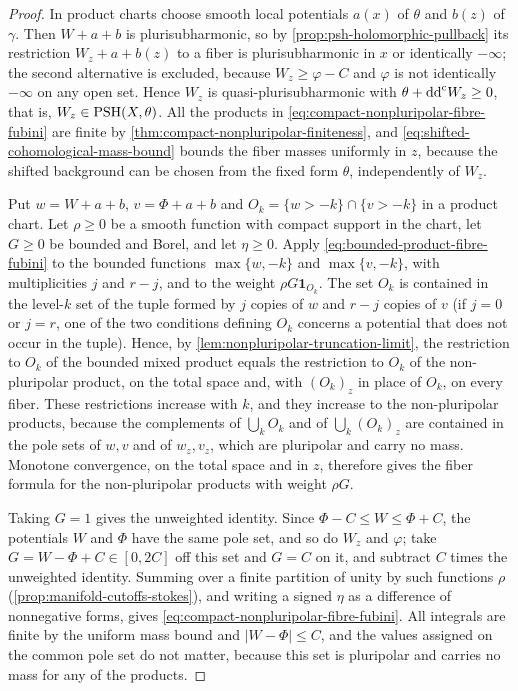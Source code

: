 \begin{proof}
In product charts choose smooth local potentials $a(x)$ of $\theta$ and $b(z)$ of $\gamma$. Then $W+a+b$ is plurisubharmonic, so by \cref{prop:psh-holomorphic-pullback} its restriction $W_z+a+b(z)$ to a fiber is plurisubharmonic in $x$ or identically $-\infty$; the second alternative is excluded, because $W_z\geq\varphi-C$ and $\varphi$ is not identically $-\infty$ on any open set. Hence $W_z$ is quasi-plurisubharmonic with $\theta+\mathrm{dd}^{\mathrm{c}} W_z\geq0$, that is, $W_z\in\mathrm{PSH}(X,\theta)$. All the products in \eqref{eq:compact-nonpluripolar-fibre-fubini} are finite by \cref{thm:compact-nonpluripolar-finiteness}, and \eqref{eq:shifted-cohomological-mass-bound} bounds the fiber masses uniformly in $z$, because the shifted background can be chosen from the fixed form $\theta$, independently of $W_z$.

Put $w=W+a+b$, $v=\Phi+a+b$ and $O_k=\{w>-k\}\cap\{v>-k\}$ in a product chart. Let $\rho\geq0$ be a smooth function with compact support in the chart, let $G\geq0$ be bounded and Borel, and let $\eta\geq0$. Apply \eqref{eq:bounded-product-fibre-fubini} to the bounded functions $\max\{w,-k\}$ and $\max\{v,-k\}$, with multiplicities $j$ and $r-j$, and to the weight $\rho G\mathbf1_{O_k}$. The set $O_k$ is contained in the level-$k$ set of the tuple formed by $j$ copies of $w$ and $r-j$ copies of $v$ (if $j=0$ or $j=r$, one of the two conditions defining $O_k$ concerns a potential that does not occur in the tuple). Hence, by \cref{lem:nonpluripolar-truncation-limit}, the restriction to $O_k$ of the bounded mixed product equals the restriction to $O_k$ of the non-pluripolar product, on the total space and, with $(O_k)_z$ in place of $O_k$, on every fiber. These restrictions increase with $k$, and they increase to the non-pluripolar products, because the complements of $\bigcup_kO_k$ and of $\bigcup_k(O_k)_z$ are contained in the pole sets of $w,v$ and of $w_z,v_z$, which are pluripolar and carry no mass. Monotone convergence, on the total space and in $z$, therefore gives the fiber formula for the non-pluripolar products with weight $\rho G$.

Taking $G=1$ gives the unweighted identity. Since $\Phi-C\leq W\leq\Phi+C$, the potentials $W$ and $\Phi$ have the same pole set, and so do $W_z$ and $\varphi$; take $G=W-\Phi+C\in[0,2C]$ off this set and $G=C$ on it, and subtract $C$ times the unweighted identity. Summing over a finite partition of unity by such functions $\rho$ (\cref{prop:manifold-cutoffs-stokes}), and writing a signed $\eta$ as a difference of nonnegative forms, gives \eqref{eq:compact-nonpluripolar-fibre-fubini}. All integrals are finite by the uniform mass bound and $|W-\Phi|\leq C$, and the values assigned on the common pole set do not matter, because this set is pluripolar and carries no mass for any of the products.
\end{proof}

